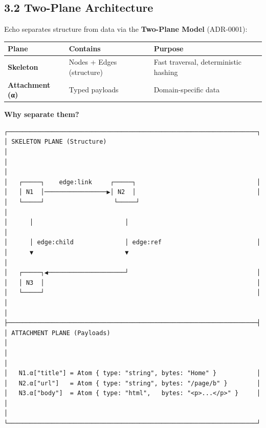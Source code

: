 \documentclass[
  11pt,
]{book}
\newcounter{none} %
\begin{document}
\subsection{3.2 Two-Plane Architecture}\label{two-plane-architecture}

Echo separates structure from data via the \textbf{Two-Plane Model}
(ADR-0001):

{\def\LTcaptype{none} %
\begin{longtable}[]{@{}
  >{\raggedright\arraybackslash}p{}
  >{\raggedright\arraybackslash}p{}
  >{\raggedright\arraybackslash}p{}@{}}
\toprule\noalign{}
\begin{minipage}[b]{\linewidth}\raggedright
Plane
\end{minipage} & \begin{minipage}[b]{\linewidth}\raggedright
Contains
\end{minipage} & \begin{minipage}[b]{\linewidth}\raggedright
Purpose
\end{minipage} \\
\midrule\noalign{}
\endhead
\bottomrule\noalign{}
\endlastfoot
\textbf{Skeleton} & Nodes + Edges (structure) & Fast traversal,
deterministic hashing \\
\textbf{Attachment (α)} & Typed payloads & Domain-specific data \\
\end{longtable}
}

\textbf{Why separate them?}

\begin{verbatim}
┌────────────────────────────────────────────────────────────────────┐
│ SKELETON PLANE (Structure)                                          │
│                                                                     │
│   ┌─────┐    edge:link     ┌─────┐                                 │
│   │ N1  │─────────────────▶│ N2  │                                 │
│   └─────┘                   └─────┘                                 │
│      │                         │                                    │
│      │ edge:child              │ edge:ref                          │
│      ▼                         ▼                                    │
│   ┌─────┐◀─────────────────────┘                                   │
│   │ N3  │                                                          │
│   └─────┘                                                          │
│                                                                     │
├────────────────────────────────────────────────────────────────────┤
│ ATTACHMENT PLANE (Payloads)                                         │
│                                                                     │
│   N1.α["title"] = Atom { type: "string", bytes: "Home" }           │
│   N2.α["url"]   = Atom { type: "string", bytes: "/page/b" }        │
│   N3.α["body"]  = Atom { type: "html",   bytes: "<p>...</p>" }     │
│                                                                     │
└────────────────────────────────────────────────────────────────────┘
\end{verbatim}
\end{document}
